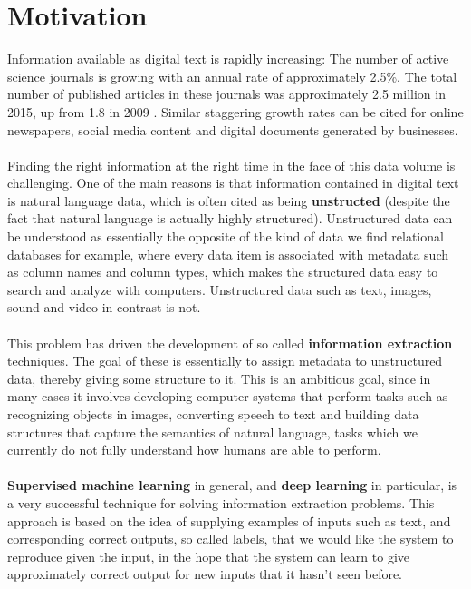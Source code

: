 \section{Motivation}
Information available as digital text is rapidly increasing: The number of active science journals is growing with an annual rate of approximately 2.5\%. The total number of published articles in these journals was approximately 2.5 million in 2015, up from 1.8 in 2009 \citep{ware2009, ware2015}. Similar staggering growth rates can be cited for online newspapers, social media content and digital documents generated by businesses.
\\\\
Finding the right information at the right time in the face of this data volume is challenging. One of the main reasons is that information contained in digital text is natural language data, which is often cited as being \textbf{unstructed} (despite the fact that natural language is actually highly structured). Unstructured data can be understood as essentially the opposite of the kind of data we find relational databases for example, where every data item is associated with metadata such as column names and column types, which makes the structured data easy to search and analyze with computers. Unstructured data such as text, images, sound and video
 in contrast is not.
\\\\
This problem has driven the development of so called \textbf{information extraction} techniques. The goal of these is essentially to assign metadata to unstructured data, thereby giving some structure to it. This is an ambitious goal, since in many cases it involves developing computer systems that perform tasks such as recognizing objects in images, converting speech to text and building data structures that capture the semantics of natural language, tasks which we currently do not fully understand how humans are able to perform.
\\\\
\textbf{Supervised machine learning} in general, and \textbf{deep learning} in particular, is a very successful technique for solving information extraction problems. This approach is based on the idea of supplying examples of inputs such as text, and corresponding correct outputs, so called labels, that we would like the system to reproduce given the input, in the hope that the system can learn to give approximately correct output for new inputs that it hasn't seen before.
\\\\
